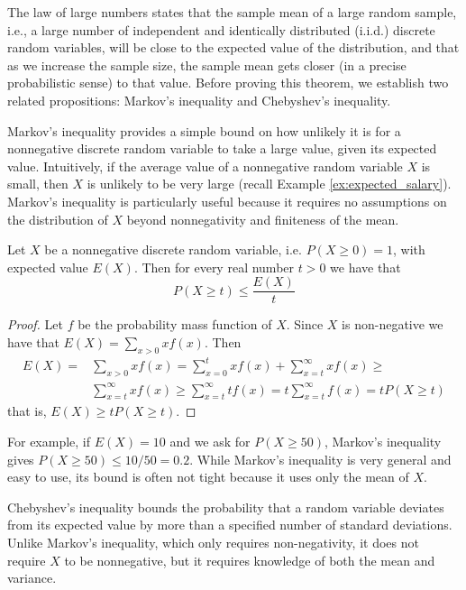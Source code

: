 The law of large numbers states that the sample mean of a large random sample, i.e., a large number of independent and identically distributed (i.i.d.) discrete random variables, will be close to the expected value of the distribution, and that as we increase the sample size, the sample mean gets closer (in a precise probabilistic sense) to that value. Before proving this theorem, we establish two related propositions: Markov's inequality and Chebyshev's inequality.

Markov's inequality provides a simple bound on how unlikely it is for a nonnegative discrete random variable to take a large value, given its expected value. Intuitively, if the average value of a nonnegative random variable $X$ is small, then $X$ is unlikely to be very large (recall Example \ref{ex:expected_salary}). Markov's inequality is particularly useful because it requires no assumptions on the distribution of $X$ beyond nonnegativity and finiteness of the mean.

\begin{proposition}
Let $X$ be a nonnegative discrete random variable, i.e. $P\left( X \geq 0 \right) = 1$, with expected value $E(X)$. Then for every real number $t>0$ we have that 
\[
P \left( X \geq t \right) \leq \frac{E(X)}{t}
\]
\end{proposition}
\begin{proof}
Let $f$ be the probability mass function of $X$. Since $X$ is non-negative we have that $E(X) = \sum_{x>0} x f \left( x \right)$. Then
\begin{equation*}
\begin{split}
E(X) = & \sum_{x>0} x f \left( x \right) = \sum_{x=0}^{t} x f \left( x \right) + \sum_{x=t}^{\infty} x f \left( x \right) \geq \\
& \sum_{x=t}^{\infty} x f \left( x \right) \geq \sum_{x=t}^{\infty} t f \left( x \right) = t \sum_{x=t}^{\infty} f \left( x \right) =
t P \left( X \geq t \right)
\end{split}  
\end{equation*}
that is, $E(X) \geq t P \left( X \geq t \right)$.
\end{proof}

For example, if $E(X)=10$ and we ask for $P(X \ge 50)$, Markov's inequality gives $P(X \ge 50) \le 10/50 = 0.2$. While Markov's inequality is very general and easy to use, its bound is often not tight because it uses only the mean of $X$.

Chebyshev's inequality bounds the probability that a random variable deviates from its expected value by more than a specified number of standard deviations. Unlike Markov's inequality, which only requires non-negativity, it does not require $X$ to be nonnegative, but it requires knowledge of both the mean and variance.

